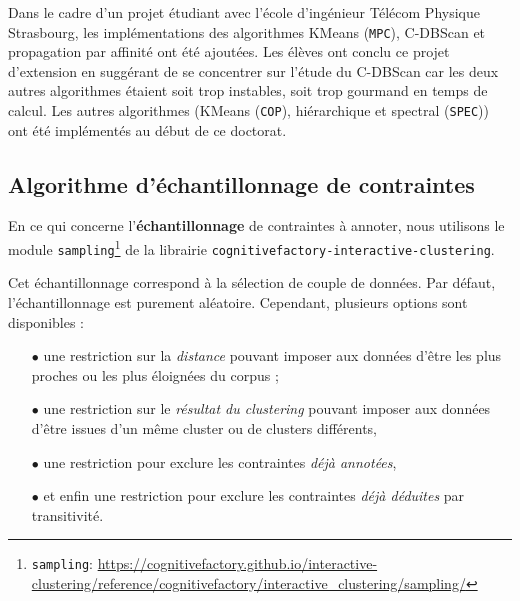 	\begin{leftBarInformation}
		Dans le cadre d'un projet étudiant avec l'école d'ingénieur Télécom Physique Strasbourg, les implémentations des algorithmes  KMeans (\texttt{MPC}), C-DBScan et propagation par affinité ont été ajoutées. Les élèves ont conclu ce projet d'extension en suggérant de se concentrer sur l'étude du C-DBScan car les deux autres algorithmes étaient soit trop instables, soit trop gourmand en temps de calcul.
		Les autres algorithmes (KMeans (\texttt{COP}), hiérarchique et spectral (\texttt{SPEC})) ont été implémentés au début de ce doctorat.
	\end{leftBarInformation}
	
	
	\subsection{Algorithme d'échantillonnage de contraintes}
	\label{section:C.1.4-DESCRIPTION-IMPLEMENTATION-INTERACTIVE-CLUSTERING-ALGORITHMES-ECHANTILLONNAGE-DE-CONTRAINTES}
	
	En ce qui concerne l'\textbf{échantillonnage} de contraintes à annoter, nous utilisons le module \texttt{sampling}\footnote{
		\texttt{sampling}: \url{https://cognitivefactory.github.io/interactive-clustering/reference/cognitivefactory/interactive_clustering/sampling/}
	} de la librairie \texttt{cognitivefactory-interactive-clustering}.
	
	Cet échantillonnage correspond à la sélection de couple de données.
	Par défaut, l'échantillonnage est purement aléatoire.
	Cependant, plusieurs options sont disponibles :
	
	\begin{itemize}
		\item[\(\bullet\)] une restriction sur la \textit{distance} pouvant imposer aux données d'être les plus proches ou les plus éloignées du corpus ;
		\item[\(\bullet\)] une restriction sur le \textit{résultat du clustering} pouvant imposer aux données d'être issues d'un même cluster ou de clusters différents,
		\item[\(\bullet\)] une restriction pour exclure les contraintes \textit{déjà annotées},
		\item[\(\bullet\)] et enfin une restriction pour exclure les contraintes \textit{déjà déduites} par transitivité.
	\end{itemize}
	
